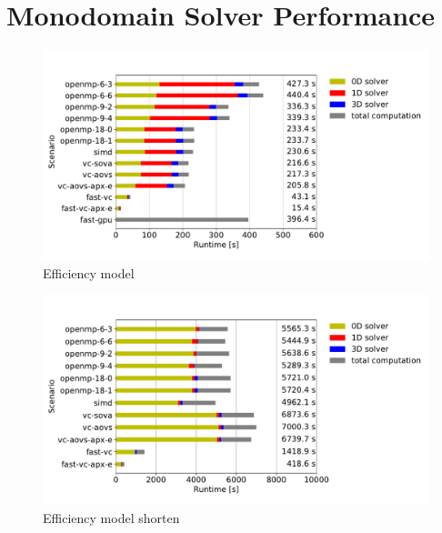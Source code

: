 \section{Monodomain Solver Performance}

\begin{figure}
  \centering%
  \includegraphics[width=\textwidth]{images/results/studies/fibers_emg_study.pdf}%
  \caption{Efficiency model}%
  \label{fig:fibers_emg_study}%
\end{figure}%

\begin{figure}
  \centering%
  \includegraphics[width=\textwidth]{images/results/studies/fibers_emg_study_shorten.pdf}%
  \caption{Efficiency model shorten}%
  \label{fig:fibers_emg_study_shorten}%
\end{figure}%

